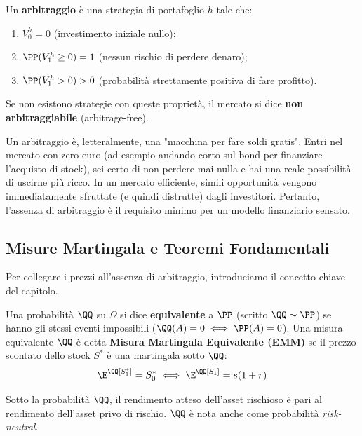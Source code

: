 \begin{definition}[Arbitraggio]
Un \textbf{arbitraggio} è una strategia di portafoglio $h$ tale che:
\begin{enumerate}
    \item $V_0^h = 0$ (investimento iniziale nullo);
    \item $\PP(V_1^h \ge 0) = 1$ (nessun rischio di perdere denaro);
    \item $\PP(V_1^h > 0) > 0$ (probabilità strettamente positiva di fare profitto).
\end{enumerate}
Se non esistono strategie con queste proprietà, il mercato si dice \textbf{non arbitraggiabile} (arbitrage-free).
\end{definition}

\begin{hint}
Un arbitraggio è, letteralmente, una "macchina per fare soldi gratis". Entri nel mercato con zero euro (ad esempio andando corto sul bond per finanziare l'acquisto di stock), sei certo di non perdere mai nulla e hai una reale possibilità di uscirne più ricco. In un mercato efficiente, simili opportunità vengono immediatamente sfruttate (e quindi distrutte) dagli investitori. Pertanto, l'assenza di arbitraggio è il requisito minimo per un modello finanziario sensato.
\end{hint}

\subsection{Misure Martingala e Teoremi Fondamentali}

Per collegare i prezzi all'assenza di arbitraggio, introduciamo il concetto chiave del capitolo.

\begin{definition}
Una probabilità $\QQ$ su $\Omega$ si dice \textbf{equivalente} a $\PP$ (scritto $\QQ \sim \PP$) se hanno gli stessi eventi impossibili ($\QQ(A)=0 \iff \PP(A)=0$).
Una misura equivalente $\QQ$ è detta \textbf{Misura Martingala Equivalente (EMM)} se il prezzo scontato dello stock $S^*$ è una martingala sotto $\QQ$:
\[ \E^\QQ[S^*_1] = S^*_0 \iff \E^\QQ[S_1] = s(1+r) \]
\end{definition}

Sotto la probabilità $\QQ$, il rendimento atteso dell'asset rischioso è pari al rendimento dell'asset privo di rischio. $\QQ$ è nota anche come probabilità \emph{risk-neutral}.

